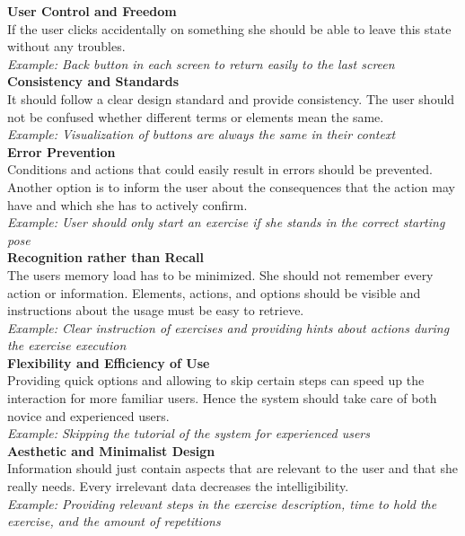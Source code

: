 \textbf{User Control and Freedom}\\
If the user clicks accidentally on something she should be able to leave this state without any troubles.\\
\textit{Example: Back button in each screen to return easily to the last screen}\\

\textbf{Consistency and Standards}\\
It should follow a clear design standard and provide consistency. The user should not be confused whether different terms or elements mean the same.\\
\textit{Example: Visualization of buttons are always the same in their context}\\

\textbf{Error Prevention}\\
Conditions and actions that could easily result in errors should be prevented. Another option is to inform the user about the consequences that the action may have and which she has to actively confirm.\\
\textit{Example: User should only start an exercise if she stands in the correct starting pose}\\

\textbf{Recognition rather than Recall}\\
The users memory load has to be minimized. She should not remember every action or information. Elements, actions, and options should be visible and instructions about the usage must be easy to retrieve.\\
\textit{Example: Clear instruction of exercises and providing hints about actions during the exercise execution}\\

\textbf{Flexibility and Efficiency of Use}\\
Providing quick options and allowing to skip certain steps can speed up the interaction for more familiar users. Hence the system should take care of both novice and experienced users.\\
\textit{Example: Skipping the tutorial of the system for experienced users}\\

\textbf{Aesthetic and Minimalist Design}\\
Information should just contain aspects that are relevant to the user and that she really needs. Every irrelevant data decreases the intelligibility.\\
\textit{Example: Providing relevant steps in the exercise description, time to hold the exercise, and the amount of repetitions}\\

